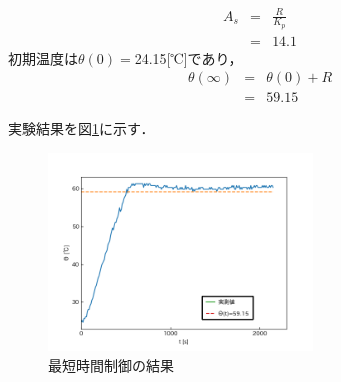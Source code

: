 \documentclass[12pt]{jsarticle}
\begin{document}
\begin{eqnarray}
  \label{A_s}
  A_s &=& \frac{R}{K_p} \\
      &=& 14.1
\end{eqnarray}
初期温度は$\theta(0)=$24.15[℃]であり，
\begin{eqnarray}
  \label{}
  \theta(\infty) &=& \theta(0) + R\\
  &=& 59.15
\end{eqnarray}

実験結果を図\ref{Control_Exp}に示す．
\begin{figure}[tb]
  \begin{center}
    \includegraphics[clip,width=7.0cm]{../graph/Control_Exp.png}
    \caption{最短時間制御の結果}
    \label{Control_Exp}
  \end{center}
\end{figure}
\end{document}
